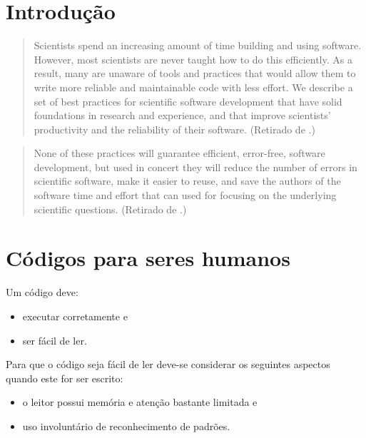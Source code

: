 \documentclass[11pt]{beamer}
\begin{document}
\begin{frame}
    \tableofcontents
\end{frame}

\section{Introdução}
\begin{frame}
    \begin{quotation}
        Scientists spend an increasing amount of time building and using
        software. However, most scientists are never taught how to do this
        efficiently. As a result, many are unaware of tools and practices that
        would allow them to write more reliable and maintainable code with less
        effort. We describe a set of best practices for scientific software
        development that have solid foundations in research and experience, and
        that improve scientists’ productivity and the reliability of their
        software. (Retirado de \cite{Aruliah-2012-Best}.)
    \end{quotation}
\end{frame}

\begin{frame}
    \begin{quotation}
        None of these practices will guarantee efficient, error-free, software
        development, but used in concert they will reduce the number of
        errors in scientific software, make it easier to reuse, and save the
        authors of the software time and effort that can used for focusing on
        the underlying scientific questions. (Retirado de
        \cite{Aruliah-2012-Best}.)
    \end{quotation}
\end{frame}

\section{Códigos para seres humanos}
\begin{frame}
    Um código deve:
    \begin{itemize}
        \item executar corretamente e
        \item ser fácil de ler.
    \end{itemize}

    \pause
    Para que o código seja fácil de ler deve-se considerar os seguintes
    aspectos quando este for ser escrito:
    \begin{itemize}
        \item o leitor possui memória e atenção bastante limitada e
        \item uso involuntário de reconhecimento de padrões.
    \end{itemize}
\end{frame}
\end{document}
